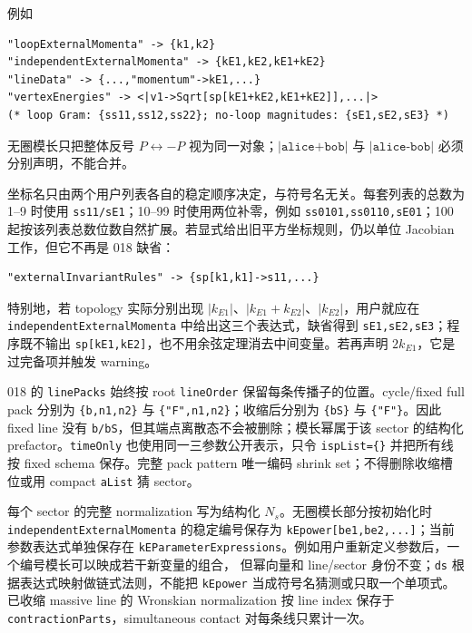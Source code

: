 ﻿\documentclass[a4paper,11pt]{article}
\begin{document}
例如
\begin{verbatim}
"loopExternalMomenta" -> {k1,k2}
"independentExternalMomenta" -> {kE1,kE2,kE1+kE2}
"lineData" -> {...,"momentum"->kE1,...}
"vertexEnergies" -> <|v1->Sqrt[sp[kE1+kE2,kE1+kE2]],...|>
(* loop Gram: {ss11,ss12,ss22}; no-loop magnitudes: {sE1,sE2,sE3} *)
\end{verbatim}
无圈模长只把整体反号 $P\leftrightarrow-P$ 视为同一对象；$|\texttt{alice+bob}|$ 与 $|\texttt{alice-bob}|$ 必须分别声明，不能合并。

坐标名只由两个用户列表各自的稳定顺序决定，与符号名无关。每套列表的总数为 1--9 时使用 \texttt{ss11/sE1}；10--99 时使用两位补零，例如 \texttt{ss0101,ss0110,sE01}；100 起按该列表总数位数自然扩展。若显式给出旧平方坐标规则，仍以单位 Jacobian 工作，但它不再是 018 缺省：
\begin{verbatim}
"externalInvariantRules" -> {sp[k1,k1]->s11,...}
\end{verbatim}

特别地，若 topology 实际分别出现 $|k_{E1}|$、$|k_{E1}+k_{E2}|$、$|k_{E2}|$，用户就应在 \texttt{independentExternal\allowbreak Momenta} 中给出这三个表达式，缺省得到 \texttt{sE1,sE2,sE3}；程序既不输出 \texttt{sp[kE1,kE2]}，也不用余弦定理消去中间变量。若再声明 $2k_{E1}$，它是过完备项并触发 warning。

018 的 \texttt{linePacks} 始终按 root \texttt{lineOrder} 保留每条传播子的位置。cycle/fixed full pack 分别为 \texttt{\{b,n1,n2\}} 与 \texttt{\{"F",n1,n2\}}；收缩后分别为 \texttt{\{bS\}} 与 \texttt{\{"F"\}}。因此 fixed line 没有 \texttt{b/bS}，但其端点离散态不会被删除；模长幂属于该 sector 的结构化 prefactor。\texttt{timeOnly} 也使用同一三参数公开表示，只令 \texttt{ispList=\{\}} 并把所有线按 fixed schema 保存。完整 pack pattern 唯一编码 shrink set；不得删除收缩槽位或用 compact \texttt{aList} 猜 sector。

每个 sector 的完整 normalization 写为结构化 $N_s$。无圈模长部分按初始化时
\texttt{independentExternalMomenta} 的稳定编号保存为
\texttt{kEpower[be1,be2,...]}；当前参数表达式单独保存在
\texttt{kEParameterExpressions}。例如用户重新定义参数后，一个编号模长可以映成若干新变量的组合，
但幂向量和 line/sector 身份不变；\texttt{ds} 根据表达式映射做链式法则，不能把
\texttt{kEpower} 当成符号名猜测或只取一个单项式。已收缩 massive line 的 Wronskian normalization
按 line index 保存于 \texttt{contractionParts}，simultaneous contact 对每条线只累计一次。
\end{document}
